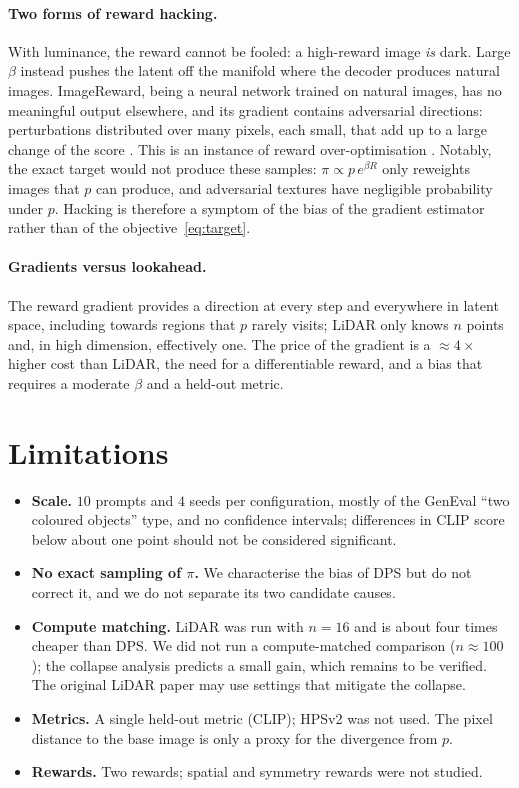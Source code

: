 \documentclass[11pt]{article}
\begin{document}
\paragraph{Two forms of reward hacking.}
With luminance, the reward cannot be fooled: a high-reward image \emph{is} dark. Large $\beta$ instead pushes the latent off the manifold where the decoder produces natural images. ImageReward, being a neural network trained on natural images, has no meaningful output elsewhere, and its gradient contains adversarial directions: perturbations distributed over many pixels, each small, that add up to a large change of the score \citep{goodfellow2015adversarial}. This is an instance of reward over-optimisation \citep{gao2023overoptimization}. Notably, the exact target would not produce these samples: $\pi\propto p\,e^{\beta R}$ only reweights images that $p$ can produce, and adversarial textures have negligible probability under $p$. Hacking is therefore a symptom of the bias of the gradient estimator rather than of the objective~\eqref{eq:target}.

\paragraph{Gradients versus lookahead.}
The reward gradient provides a direction at every step and everywhere in latent space, including towards regions that $p$ rarely visits; LiDAR only knows $n$ points and, in high dimension, effectively one. The price of the gradient is a $\approx4\times$ higher cost than LiDAR, the need for a differentiable reward, and a bias that requires a moderate $\beta$ and a held-out metric.

\section{Limitations}
\label{sec:limitations}
\begin{itemize}[leftmargin=*, itemsep=2pt]
  \item \textbf{Scale.} $10$ prompts and $4$ seeds per configuration, mostly of the GenEval ``two coloured objects'' type, and no confidence intervals; differences in CLIP score below about one point should not be considered significant.
  \item \textbf{No exact sampling of $\pi$.} We characterise the bias of DPS but do not correct it, and we do not separate its two candidate causes.
  \item \textbf{Compute matching.} LiDAR was run with $n=16$ and is about four times cheaper than DPS. We did not run a compute-matched comparison ($n\approx100$); the collapse analysis predicts a small gain, which remains to be verified. The original LiDAR paper may use settings that mitigate the collapse.
  \item \textbf{Metrics.} A single held-out metric (CLIP); HPSv2 \citep{wu2023hpsv2} was not used. The pixel distance to the base image is only a proxy for the divergence from $p$.
  \item \textbf{Rewards.} Two rewards; spatial and symmetry rewards were not studied.
\end{itemize}
\end{document}
